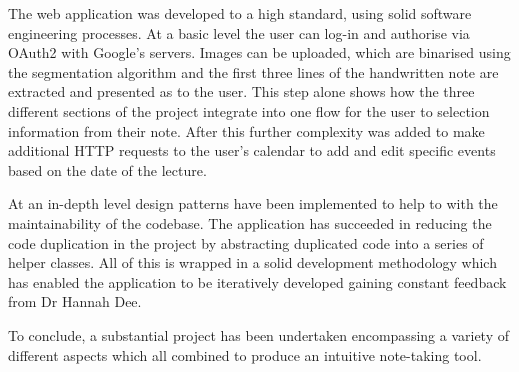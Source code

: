 The web application was developed to a high standard, using solid software engineering processes. At a basic level the user can log-in and authorise via OAuth2 with Google's servers. Images can be uploaded, which are binarised using the segmentation algorithm and the first three lines of the handwritten note are extracted and presented as to the user. This step alone shows how the three different sections of the project integrate into one flow for the user to selection information from their note. After this further complexity was added to make additional HTTP requests to the user's calendar to add and edit specific events based on the date of the lecture.

At an in-depth level design patterns have been implemented to help to with the maintainability of the codebase. The application has succeeded in reducing the code duplication in the project by abstracting duplicated code into a series of helper classes. All of this is wrapped in a solid development methodology which has enabled the application to be iteratively developed gaining constant feedback from Dr Hannah Dee.

To conclude, a substantial project has been undertaken encompassing a variety of different aspects which all combined to produce an intuitive note-taking tool.
